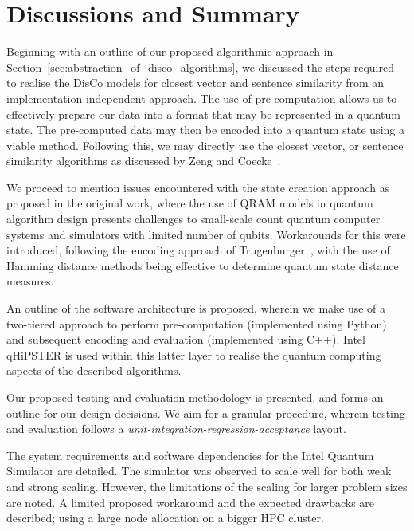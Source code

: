 \section{Discussions and Summary}
\label{sec:discussion_and_summary}
Beginning with an outline of our proposed algorithmic approach in Section~\ref{sec:abstraction_of_disco_algorithms}, we discussed the steps required to realise the DisCo models for closest vector and sentence similarity from an implementation independent approach. The use of pre-computation allows us to effectively prepare our data into a format that may be represented in a quantum state. The pre-computed data may then be encoded into a quantum state using a viable method. Following this, we may directly use the closest vector, or sentence similarity algorithms as discussed by 
Zeng and Coecke~\cite{Zeng_Coecke_2016}.

We proceed to mention issues encountered with the state creation approach as proposed in the original work, where the use of QRAM models in quantum algorithm design presents challenges to small-scale count quantum computer systems and simulators with limited number of qubits. Workarounds for this were introduced, following the encoding approach of Trugenburger~\cite{Trugenberger_2001}, with the use of Hamming distance methods being effective to determine quantum state distance measures. 

An outline of the software architecture is proposed, wherein we make use of a two-tiered approach to perform pre-computation (implemented using Python) and subsequent encoding and evaluation (implemented using C++). Intel qHiPSTER is used within this latter layer to realise the quantum computing aspects of the described algorithms.

Our proposed testing and evaluation methodology is presented, and forms an outline for our design decisions. We aim for a granular procedure, wherein testing and evaluation follows a \emph{unit-integration-regression-acceptance} layout.


The system requirements and software dependencies for the Intel Quantum Simulator are detailed. The simulator was observed to scale well for both weak and strong scaling. However, the limitations of the scaling for larger problem sizes are noted. A limited proposed workaround and the expected drawbacks are described; using a large node allocation on a bigger HPC cluster.

